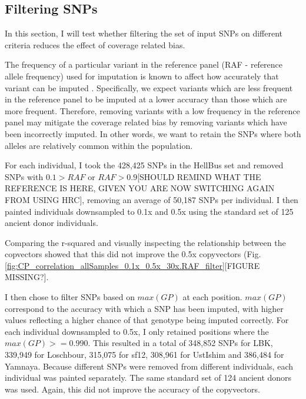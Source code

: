 \subsection{Filtering SNPs}

In this section, I will test whether filtering the set of input SNPs on different criteria reduces the effect of coverage related bias. 

The frequency of a particular variant in the reference panel (RAF - reference allele frequency) used for imputation is known to affect how accurately that variant can be imputed \cite{rubinacci2021efficient, delaneau2018integrative, Browning2016, hui2020evaluating}. Specifically, we expect variants which are less frequent in the reference panel to be imputed at a lower accuracy than those which are more frequent. Therefore, removing variants with a low frequency in the reference panel may mitigate the coverage related bias by removing variants which have been incorrectly imputed. In other words, we want to retain the SNPs where both alleles are relatively common within the population. 

For each individual, I took the 428,425 SNPs in the HellBus set and removed SNPs with $0.1 > RAF$ or $RAF > 0.9${\color{red}[SHOULD REMIND WHAT THE REFERENCE IS HERE, GIVEN YOU ARE NOW SWITCHING AGAIN FROM USING HRC]}, removing an average of 50,187 SNPs per individual. I then painted individuals downsampled to 0.1x and 0.5x using the standard set of 125 ancient donor individuals.  

Comparing the r-squared and visually inspecting the relationship between the copvectors showed that this did not improve the 0.5x copyvectors (Fig. \ref{fig:CP_correlation_allSamples_0.1x_0.5x_30x.RAF_filter}{\color{red}[FIGURE MISSING?]}.

I then chose to filter SNPs based on $max(GP)$ at each position. $max(GP)$ correspond to the accuracy with which a SNP has been imputed, with higher values reflecting a higher chance of that genotype being imputed correctly. For each individual downsampled to 0.5x, I only retained positions where the $max(GP) >= 0.990$. This resulted in a total of 348,852 SNPs for LBK, 339,949 for Loschbour, 315,075 for sf12, 308,961 for UstIshim and 386,484 for Yamnaya. Because different SNPs were removed from different individuals, each individual was painted separately. The same standard set of 124 ancient donors was used. Again, this did not improve the accuracy of the copyvectors. 

